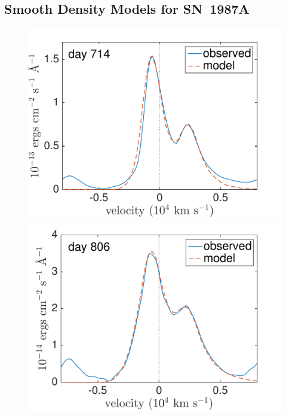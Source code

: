 \subsection{Smooth Density Models for SN~1987A}
\label{smooth_models}

\begin{figure}
\centering
\includegraphics[trim =0 33 0 0,clip=true,scale=0.37]{chapters/chapter5/images/smooth/best_fit/d714OI.pdf}
\hspace{0mm}
\includegraphics[trim = 0 33 0 0,clip=true,scale=0.37]{chapters/chapter5/images/smooth/best_fit/d806OI_ext.pdf}


\end{figure}
